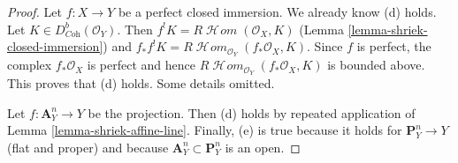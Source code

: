 \documentclass[10pt,a4paper]{amsart}
\theoremstyle{plain}
\theoremstyle{definition}
\theoremstyle{remark}
\numberwithin{equation}{subsection}
\def\SheafHom{\mathop{\mathcal{H}\!\mathit{om}}\nolimits}
\begin{document}
\begin{proof}
\medskip\noindent
Let $f : X \to Y$ be a perfect closed immersion. We already know (d) holds.
Let $K \in D^b_{\textit{Coh}}(\mathcal{O}_Y)$.
Then $f^!K = R\SheafHom(\mathcal{O}_X, K)$
(Lemma \ref{lemma-shriek-closed-immersion})
and $f_*f^!K = R\SheafHom_{\mathcal{O}_Y}(f_*\mathcal{O}_X, K)$.
Since $f$ is perfect, the complex $f_*\mathcal{O}_X$ is perfect
and hence $R\SheafHom_{\mathcal{O}_Y}(f_*\mathcal{O}_X, K)$ is bounded above.
This proves that (d) holds. Some details omitted.

\medskip\noindent
Let $f : \mathbf{A}^n_Y \to Y$ be the projection. Then (d) holds
by repeated application of Lemma \ref{lemma-shriek-affine-line}.
Finally, (e) is true because it holds for $\mathbf{P}^n_Y \to Y$
(flat and proper) and because $\mathbf{A}^n_Y \subset \mathbf{P}^n_Y$
is an open.
\end{proof}
\end{document}
